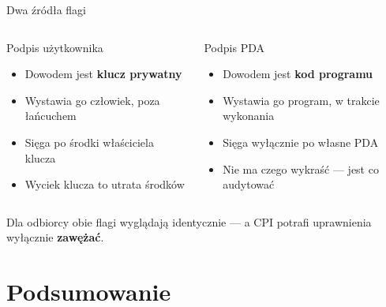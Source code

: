 \begin{frame}{Dwa źródła flagi}
  \addtocounter{beamerpauses}{-3}%
  \begin{columns}
      \begin{block}{Podpis użytkownika}
        \begin{itemize}
          \item<+-> Dowodem jest \textbf{klucz prywatny}
          \item<+-> Wystawia go człowiek, poza łańcuchem
          \item<+-> Sięga po środki właściciela klucza
          \item<+-> Wyciek klucza to utrata środków
        \end{itemize}
      \end{block}

      \begin{alertblock}{Podpis PDA}
        \begin{itemize}
          \item<+-> Dowodem jest \textbf{kod programu}
          \item<+-> Wystawia go program, w trakcie wykonania
          \item<+-> Sięga wyłącznie po własne PDA
          \item<+-> Nie ma czego wykraść --- jest co audytować
        \end{itemize}
      \end{alertblock}
  \end{columns}
  \vspace{0.15cm}
  \begin{center}
    \textcolor{stplmuted}{\small Dla odbiorcy obie flagi wyglądają identycznie ---
    a CPI potrafi uprawnienia wyłącznie \textbf{zawężać}.}
  \end{center}
\end{frame}

\section{Podsumowanie}

